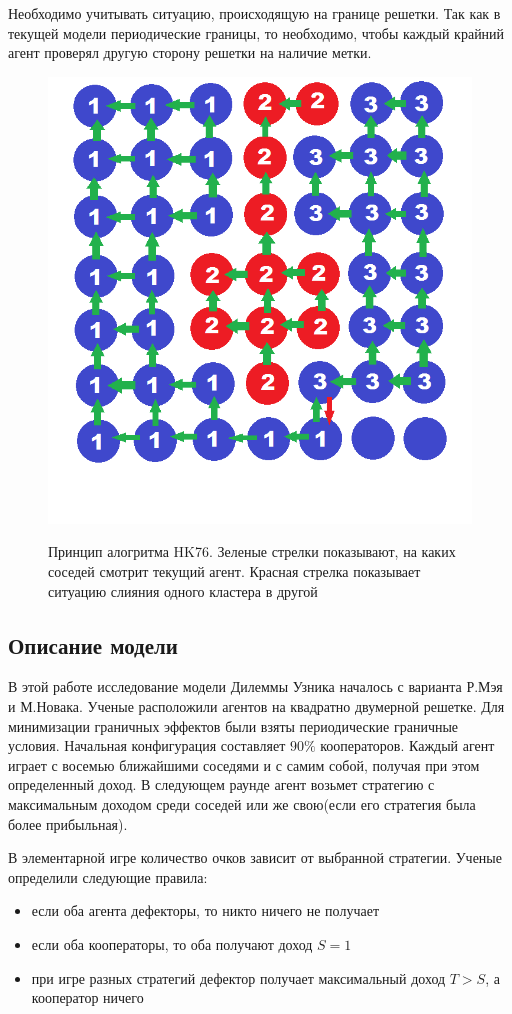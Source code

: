 \documentclass[12pt,a4paper]{article}
\begin{document}
	\par Необходимо учитывать ситуацию, происходящую на границе решетки. Так как в текущей модели периодические границы, то необходимо, чтобы каждый крайний агент проверял другую сторону решетки на наличие метки.
	\begin{figure}[H]
		\centering
		\includegraphics[width=0.5\linewidth]{HKpic2.png}
		\label{hkpic}
		\caption{Принцип алогритма HK76. Зеленые стрелки показывают, на каких соседей смотрит текущий агент. Красная стрелка показывает ситуацию слияния одного кластера в другой}
	\end{figure}
	
	
	\subsection{Описание модели}
	\par В этой работе исследование модели Дилеммы Узника началось с варианта Р.Мэя и М.Новака. Ученые расположили агентов на квадратно двумерной решетке. Для минимизации граничных эффектов были взяты периодические граничные условия. Начальная конфигурация составляет $90\%$ кооператоров. Каждый агент играет с восемью ближайшими соседями и с самим собой, получая при этом определенный доход. В следующем раунде агент возьмет стратегию с максимальным доходом среди соседей или же свою(если его стратегия была более прибыльная).
	
	\par В элементарной игре количество очков зависит от выбранной стратегии. Ученые определили следующие правила:
	\begin{itemize}
		\item если оба агента дефекторы, то никто ничего не получает
		\item если оба кооператоры, то оба получают доход $S=1$
		\item при игре разных стратегий дефектор получает максимальный доход $T>S$, а кооператор ничего
	\end{itemize}
	
\end{document}
